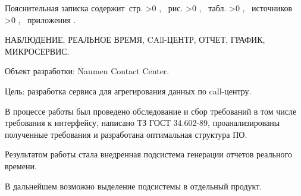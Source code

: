 \Referat

Пояснительная записка содержит \pageref{LastPage}\,стр.%
\ifnum \totfig >0
, \totfig~рис.%
\fi
\ifnum \tottab >0
, \tottab~табл.%
\fi
%
\ifnum \totbib >0
, \totbib~источников%
\fi
%
\ifnum \totapp >0
, \totapp~приложения%
\else
.%
\fi

НАБЛЮДЕНИЕ, РЕАЛЬНОЕ ВРЕМЯ, CAll-ЦЕНТР, ОТЧЕТ, ГРАФИК, МИКРОСЕРВИС.

Объект разработки: Naumen Contact Center.

Цель: разработка сервиса для агрегирования данных по call-центру.

В процессе работы был проведено обследование и сбор требований в том числе требования к интерфейсу,
написано ТЗ ГОСТ 34.602-89, проанализированы полученные требования и разработана оптимальная структура ПО.

Результатом работы стала внедренная подсистема генерации отчетов реального времени.

В дальнейшем возможно выделение подсистемы в отдельный продукт.